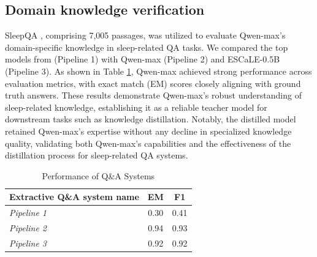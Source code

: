 \documentclass[preprint,12pt]{elsarticle}
\begin{document}
\subsection{Domain knowledge verification}
SleepQA \cite{bojic2023building}, comprising 7,005 passages, was utilized to evaluate Qwen-max's domain-specific knowledge in sleep-related QA tasks. We compared the top models from \cite{bojic2023building} (Pipeline 1) with Qwen-max (Pipeline 2) and ESCaLE-0.5B (Pipeline 3). As shown in Table \ref{tab:table_qwenmax}, Qwen-max achieved strong performance across evaluation metrics, with exact match (EM) scores closely aligning with ground truth answers. These results demonstrate Qwen-max's robust understanding of sleep-related knowledge, establishing it as a reliable teacher model for downstream tasks such as knowledge distillation. Notably, the distilled model retained Qwen-max's expertise without any decline in specialized knowledge quality, validating both Qwen-max's capabilities and the effectiveness of the distillation process for sleep-related QA systems.
\begin{table}[H]
\centering
\caption{\label{tab:table_qwenmax}Performance of Q\&A Systems}
\begin{tabular}{l|c|c}
\toprule
\textbf{Extractive Q\&A system name} & \textbf{EM} & \textbf{F1}\\
\midrule
\textit{Pipeline 1} & 0.30 & 0.41\\
\textit{Pipeline 2} & 0.94 & 0.93\\
\textit{Pipeline 3} & 0.92 & 0.92\\
\bottomrule
\end{tabular}
\end{table}
\end{document}

